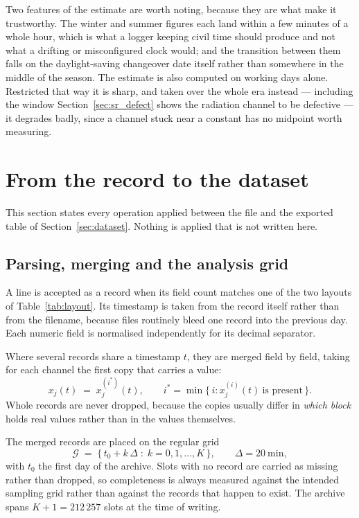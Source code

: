\documentclass[11pt,a4paper]{article}
\begin{document}
Two features of the estimate are worth noting, because they are what make it trustworthy. The winter and summer figures each land within a few minutes of a whole hour, which is what a logger keeping civil time should produce and not what a drifting or misconfigured clock would; and the transition between them falls on the daylight-saving changeover date itself rather than somewhere in the middle of the season. The estimate is also computed on working days alone. Restricted that way it is sharp, and taken over the whole era instead --- including the window Section~\ref{sec:sr_defect} shows the radiation channel to be defective --- it degrades badly, since a channel stuck near a constant has no midpoint worth measuring.

\section{From the record to the dataset}
\label{sec:pipeline}

This section states every operation applied between the file and the exported table of Section~\ref{sec:dataset}. Nothing is applied that is not written here.

\subsection{Parsing, merging and the analysis grid}

A line is accepted as a record when its field count matches one of the two layouts of Table~\ref{tab:layout}. Its timestamp is taken from the record itself rather than from the filename, because files routinely bleed one record into the previous day. Each numeric field is normalised independently for its decimal separator.

Where several records share a timestamp $t$, they are merged field by field, taking for each channel the first copy that carries a value:
\begin{equation}
\label{eq:merge}
x_j(t) \;=\; x_j^{(i^\ast)}(t), \qquad
i^\ast = \min\{\, i : x_j^{(i)}(t) \ \text{is present} \,\}.
\end{equation}
Whole records are never dropped, because the copies usually differ in \emph{which block} holds real values rather than in the values themselves.

The merged records are placed on the regular grid
\begin{equation}
\label{eq:grid}
\mathcal{G} \;=\; \{\, t_0 + k\,\Delta \;:\; k = 0,1,\dots,K \,\},
\qquad \Delta = 20\ \text{min},
\end{equation}
with $t_0$ the first day of the archive. Slots with no record are carried as missing rather than dropped, so completeness is always measured against the intended sampling grid rather than against the records that happen to exist. The archive spans $K+1 = 212\,257$ slots at the time of writing.
\end{document}
